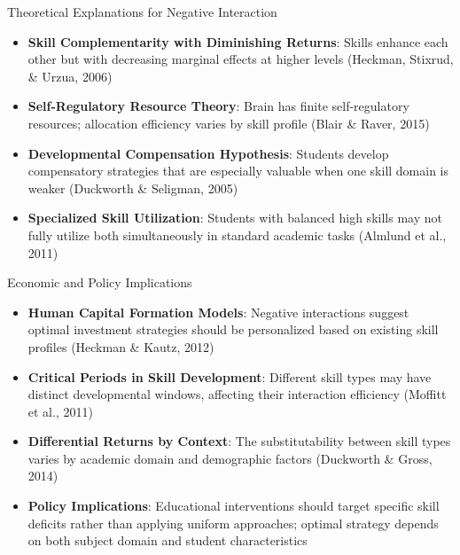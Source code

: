\documentclass{beamer}
\begin{document}
\begin{frame}{Theoretical Explanations for Negative Interaction}

    \begin{itemize}
        \item \textbf{Skill Complementarity with Diminishing Returns}: Skills enhance each other but with decreasing marginal effects at higher levels (Heckman, Stixrud, \& Urzua, 2006)
        \item \textbf{Self-Regulatory Resource Theory}: Brain has finite self-regulatory resources; allocation efficiency varies by skill profile (Blair \& Raver, 2015)
        \item \textbf{Developmental Compensation Hypothesis}: Students develop compensatory strategies that are especially valuable when one skill domain is weaker (Duckworth \& Seligman, 2005)
        \item \textbf{Specialized Skill Utilization}: Students with balanced high skills may not fully utilize both simultaneously in standard academic tasks (Almlund et al., 2011)
    \end{itemize}
\end{frame}

\begin{frame}{Economic and Policy Implications}
    \begin{itemize}
        \item \textbf{Human Capital Formation Models}: Negative interactions suggest optimal investment strategies should be personalized based on existing skill profiles (Heckman \& Kautz, 2012)
        \item \textbf{Critical Periods in Skill Development}: Different skill types may have distinct developmental windows, affecting their interaction efficiency (Moffitt et al., 2011)
        \item \textbf{Differential Returns by Context}: The substitutability between skill types varies by academic domain and demographic factors (Duckworth \& Gross, 2014)
        \item \textbf{Policy Implications}: Educational interventions should target specific skill deficits rather than applying uniform approaches; optimal strategy depends on both subject domain and student characteristics
    \end{itemize}
\end{frame}
\end{document}
